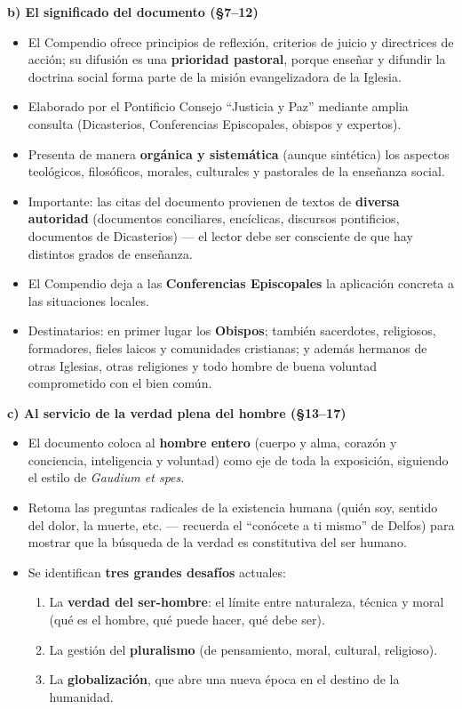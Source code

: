 \documentclass[10pt,a4paper]{article}
\begin{document}
\medskip\noindent \textbf{b) El significado del documento (\S{}7--12)}\par\nopagebreak
\begin{itemize}
\item El Compendio ofrece principios de reflexión, criterios de juicio y directrices de acción; su difusión es una \textbf{prioridad pastoral}, porque enseñar y difundir la doctrina social forma parte de la misión evangelizadora de la Iglesia.
\item Elaborado por el Pontificio Consejo ``Justicia y Paz'' mediante amplia consulta (Dicasterios, Conferencias Episcopales, obispos y expertos).
\item Presenta de manera \textbf{orgánica y sistemática} (aunque sintética) los aspectos teológicos, filosóficos, morales, culturales y pastorales de la enseñanza social.
\item Importante: las citas del documento provienen de textos de \textbf{diversa autoridad} (documentos conciliares, encíclicas, discursos pontificios, documentos de Dicasterios) --- el lector debe ser consciente de que hay distintos grados de enseñanza.
\item El Compendio deja a las \textbf{Conferencias Episcopales} la aplicación concreta a las situaciones locales.
\item Destinatarios: en primer lugar los \textbf{Obispos}; también sacerdotes, religiosos, formadores, fieles laicos y comunidades cristianas; y además hermanos de otras Iglesias, otras religiones y todo hombre de buena voluntad comprometido con el bien común.
\end{itemize}

\medskip\noindent \textbf{c) Al servicio de la verdad plena del hombre (\S{}13--17)}\par\nopagebreak
\begin{itemize}
\item El documento coloca al \textbf{hombre entero} (cuerpo y alma, corazón y conciencia, inteligencia y voluntad) como eje de toda la exposición, siguiendo el estilo de \textit{Gaudium et spes}.
\item Retoma las preguntas radicales de la existencia humana (quién soy, sentido del dolor, la muerte, etc. --- recuerda el ``conócete a ti mismo'' de Delfos) para mostrar que la búsqueda de la verdad es constitutiva del ser humano.
\item Se identifican \textbf{tres grandes desafíos} actuales:
\begin{enumerate}
\item La \textbf{verdad del ser-hombre}: el límite entre naturaleza, técnica y moral (qué es el hombre, qué puede hacer, qué debe ser).
\item La gestión del \textbf{pluralismo} (de pensamiento, moral, cultural, religioso).
\item La \textbf{globalización}, que abre una nueva época en el destino de la humanidad.
\end{enumerate}
\end{itemize}
\end{document}
